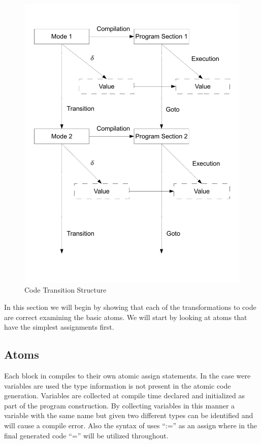 \begin{figure}[htb]
    \centering
    \includegraphics[trim= 10mm 30mm 10mm 10mm, clip, width=\imgmedium]{./images/correctness_graph2.pdf}
    \caption{Code Transition Structure}
    \label{fig:correctness_graph2}
\end{figure}

In this section we will begin by showing that each of the transformations to code are correct examining the basic atoms. We will start by looking at atoms that have the simplest assignments first.

\clearpage
\subsection{Atoms}

Each block in \plccharts compiles to their own atomic assign statements. In the case were variables are used the type information is not present in the atomic code generation. Variables are collected at compile time declared and initialized as part of the program construction. By collecting variables in this manner a variable with the same name but given two different types can be identified and will cause a compile error. Also the syntax of \plccharts uses ``:='' as an assign where in the final generated code ``='' will be utilized throughout.


